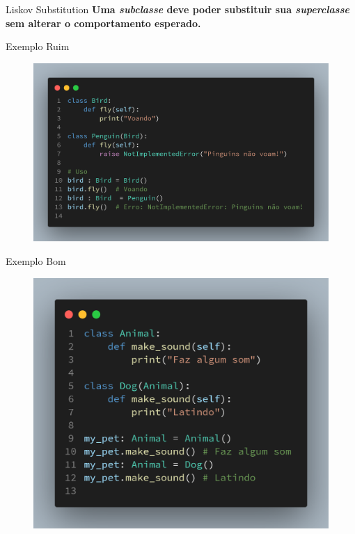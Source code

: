 \documentclass{libs/ufc_format}
\begin{document}
\begin{frame}{Liskov Substitution}
    \centering
    \textbf{Uma \emph{subclasse} deve poder substituir sua \emph{superclasse}
     sem alterar o comportamento esperado.}
\end{frame}

\begin{frame}{Exemplo \textcolor{gred}{Ruim}}
    \begin{figure}
        \centering
        \includegraphics[scale=0.18]{images/l_exemple_bad.png}
    \end{figure}
\end{frame}

\begin{frame}{Exemplo \textcolor{ggreen}{Bom}}
    \begin{figure}
        \centering
        \includegraphics[scale=0.18]{images/l_exemple_good.png}
    \end{figure}
\end{frame}
\end{document}
